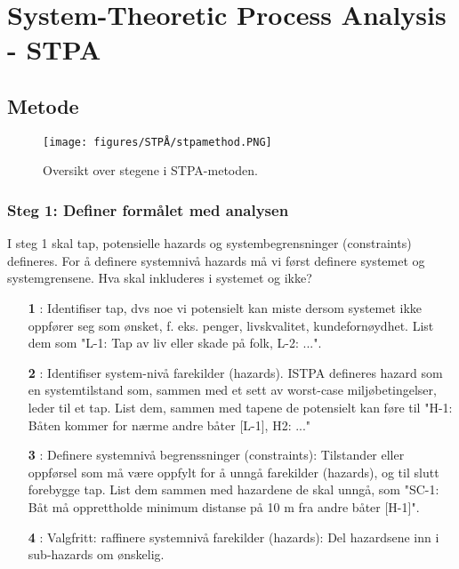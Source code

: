 \section{System-Theoretic Process Analysis - STPA}
\label{sec:stpa}

\subsection{Metode}

\begin{figure}[H]
    \centering
        \texttt{[image: figures/STPÅ/stpamethod.PNG]}\\
        \caption{Oversikt over stegene i STPA-metoden.}
\end{figure}


\subsubsection{Steg 1: Definer formålet med analysen}

I steg 1 skal tap, potensielle hazards og systembegrensninger (constraints) defineres. 
For å definere systemnivå hazards må vi først definere systemet og systemgrensene. Hva skal inkluderes i systemet og ikke?

\begin{itemize}
    \item[\textbf{1}]: Identifiser tap, dvs noe vi potensielt kan miste dersom systemet ikke oppfører seg som ønsket, f. eks. penger, livskvalitet, kundefornøydhet. List dem som "L-1: Tap av liv eller skade på folk, L-2: ...".
    \item[\textbf{2}]: Identifiser system-nivå farekilder (hazards). ISTPA defineres hazard som en systemtilstand som, sammen med et sett av worst-case miljøbetingelser, leder til et tap. List dem, sammen med tapene de potensielt kan føre til "H-1: Båten kommer for nærme andre båter [L-1], H2: ..."
    \item[\textbf{3}]: Definere systemnivå begrenssninger (constraints): Tilstander eller oppførsel som må være oppfylt for å unngå farekilder (hazards), og til slutt forebygge tap. List dem sammen med hazardene de skal unngå, som "SC-1: Båt må opprettholde minimum distanse på 10 m fra andre båter [H-1]".
    \item[\textbf{4}]: Valgfritt: raffinere systemnivå farekilder (hazards): Del hazardsene inn i sub-hazards om ønskelig.
\end{itemize}

